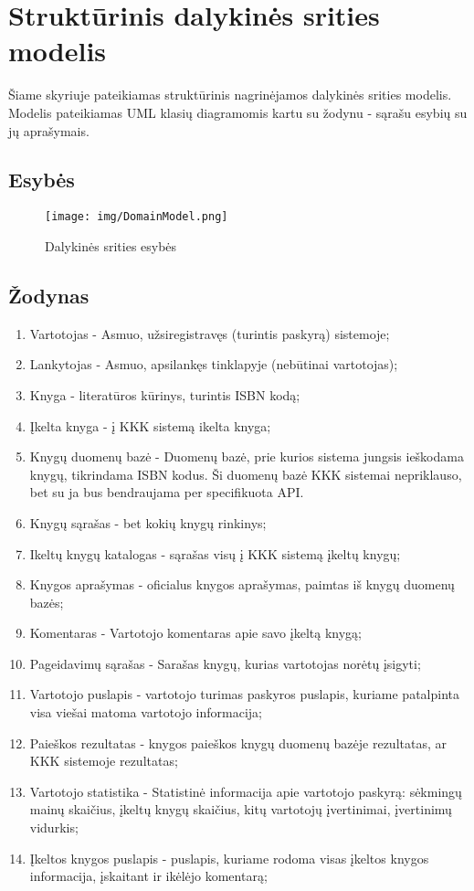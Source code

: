 \documentclass{VUMIFPSkursinis}
\begin{document}
\section{Struktūrinis dalykinės srities modelis}
	Šiame skyriuje pateikiamas struktūrinis nagrinėjamos dalykinės srities modelis. 
	Modelis pateikiamas UML klasių diagramomis kartu su žodynu - sąrašu esybių su jų aprašymais. 
	\subsection{Esybės}
		\begin{figure}[H]
			\centering
			\texttt{[image: img/DomainModel.png]}
			\caption{Dalykinės srities esybės}
			\label{img:psi2}
		\end{figure}

	\subsection{Žodynas}
		\begin{enumerate}[label=\textbf{E\arabic*.}]
			\item Vartotojas - Asmuo, užsiregistravęs (turintis paskyrą) sistemoje;
			\item Lankytojas - Asmuo, apsilankęs tinklapyje (nebūtinai vartotojas);
			\item Knyga - literatūros kūrinys, turintis ISBN kodą;
			\item Įkelta knyga - į KKK sistemą ikelta knyga;
			\item Knygų duomenų bazė - Duomenų bazė, prie kurios sistema jungsis ieškodama knygų, tikrindama ISBN kodus. 
				Ši duomenų bazė KKK sistemai nepriklauso, bet su ja bus bendraujama per specifikuota API.
			\item Knygų sąrašas - bet kokių knygų rinkinys;
			\item Ikeltų knygų katalogas - sąrašas visų į KKK sistemą įkeltų knygų;
			\item Knygos aprašymas - oficialus knygos aprašymas, paimtas iš knygų duomenų bazės;
			\item Komentaras - Vartotojo komentaras apie savo įkeltą knygą;
			\item Pageidavimų sąrašas - Sarašas knygų, kurias vartotojas norėtų įsigyti;
			\item Vartotojo puslapis - vartotojo turimas paskyros puslapis, kuriame patalpinta visa viešai matoma vartotojo informacija;
			\item Paieškos rezultatas - knygos paieškos knygų duomenų bazėje rezultatas, ar KKK sistemoje rezultatas;
			\item Vartotojo statistika - Statistinė informacija apie vartotojo paskyrą: sėkmingų mainų skaičius, įkeltų knygų skaičius,
				kitų vartotojų įvertinimai, įvertinimų vidurkis;
			\item Įkeltos knygos puslapis - puslapis, kuriame rodoma visas įkeltos knygos informacija, įskaitant ir ikėlėjo komentarą;
		\end{enumerate}
\end{document}
